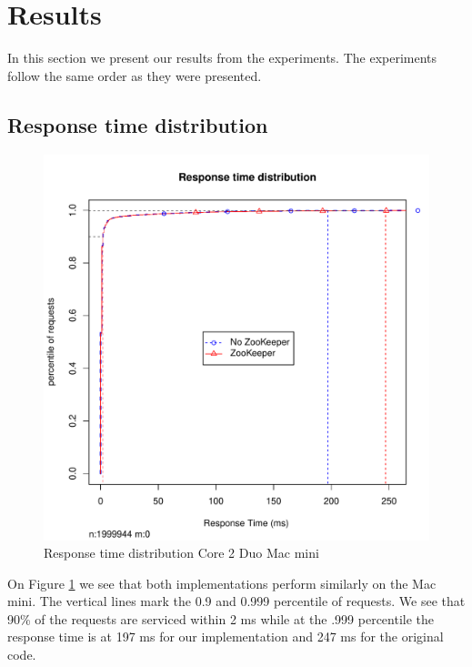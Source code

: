 \section{Results}
In this section we present our results from the experiments. The experiments follow the same order as they were presented. 


\subsection{Response time distribution}

\begin{figure}[h]
    \centering
    \includegraphics[width=1.0\textwidth]{results/distribution/distribution_macmini}
    \caption{Response time distribution Core 2 Duo Mac mini}
    \label{fig:dist_mini}
\end{figure}

On Figure \ref{fig:dist_mini} we see that both implementations perform similarly on the Mac mini. The vertical lines mark the 0.9 and 0.999 percentile of requests. We see that 90\% of the requests are serviced within 2 ms while at the .999 percentile the response time is at 197 ms for our implementation and 247 ms for the original code.  

